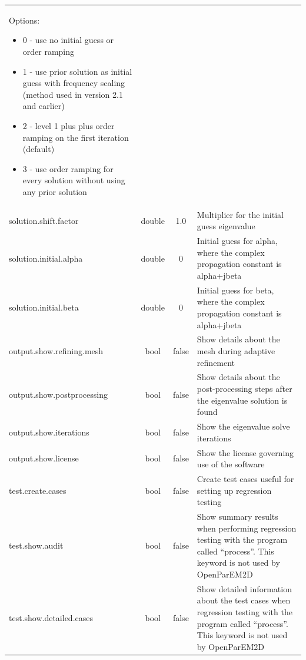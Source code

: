 \documentclass[titlepage]{article}
\renewcommand\_{\textunderscore\linebreak[1]}
\begin{document}
\begin{longtable}[c]{|lccp{8cm}|}
                                                      Options:
                                                      \begin{itemize}[nosep]
                                                        \item 0 - use no initial guess or order ramping
                                                        \item 1 - use prior solution as initial guess with frequency scaling (method used in version 2.1 and earlier)
                                                        \item 2 - level 1 plus plus order ramping on the first iteration (default)
                                                        \item 3 - use order ramping for every solution without using any prior solution
                                                      \end{itemize}\\
    solution.shift.factor         & double & 1.0    & Multiplier for the initial guess eigenvalue \\
    solution.initial.alpha        & double & 0      & Initial guess for alpha, where the complex propagation constant is alpha+jbeta \\
    solution.initial.beta         & double & 0      & Initial guess for beta, where the complex propagation constant is alpha+jbeta \\
    output.show.refining.mesh     & bool   & false  & Show details about the mesh during adaptive refinement \\
    output.show.postprocessing    & bool   & false  & Show details about the post-processing steps after the eigenvalue solution is found \\
    output.show.iterations        & bool   & false  & Show the eigenvalue solve iterations \\
    output.show.license           & bool   & false  & Show the license governing use of the software \\
    test.create.cases             & bool   & false  & Create test cases useful for setting up regression testing \\
    test.show.audit               & bool   & false  & Show summary results when performing regression testing with the program called “process”.  This keyword is not used by OpenParEM2D \\
    test.show.detailed.cases      & bool   & false  & Show detailed information about the test cases when regression testing with the program called “process”.  This keyword is not used by OpenParEM2D \\

\end{longtable}
\end{document}
